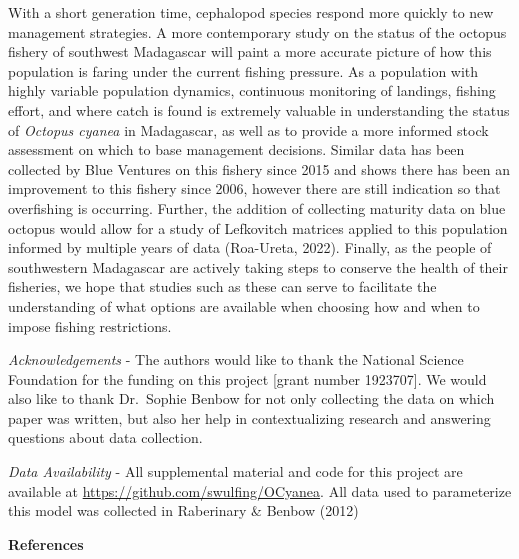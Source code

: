 \documentclass[
]{article}
\begin{document}
With a short generation time, cephalopod species respond more quickly to new management strategies. A more contemporary study on the status of the octopus fishery of southwest Madagascar will paint a more accurate picture of how this population is faring under the current fishing pressure. As a population with highly variable population dynamics, continuous monitoring of landings, fishing effort, and where catch is found is extremely valuable in understanding the status of \emph{Octopus cyanea} in Madagascar, as well as to provide a more informed stock assessment on which to base management decisions. Similar data has been collected by Blue Ventures on this fishery since 2015 and shows there has been an improvement to this fishery since 2006, however there are still indication so that overfishing is occurring. Further, the addition of collecting maturity data on blue octopus would allow for a study of Lefkovitch matrices applied to this population informed by multiple years of data (Roa-Ureta, 2022). Finally, as the people of southwestern Madagascar are actively taking steps to conserve the health of their fisheries, we hope that studies such as these can serve to facilitate the understanding of what options are available when choosing how and when to impose fishing restrictions.

\emph{Acknowledgements} - The authors would like to thank the National Science Foundation for the funding on this project {[}grant number 1923707{]}. We would also like to thank Dr.~Sophie Benbow for not only collecting the data on which paper was written, but also her help in contextualizing research and answering questions about data collection.

\emph{Data Availability} - All supplemental material and code for this project are available at \url{https://github.com/swulfing/OCyanea}. All data used to parameterize this model was collected in Raberinary \& Benbow (2012)

\newpage

\textbf{References}
\end{document}
